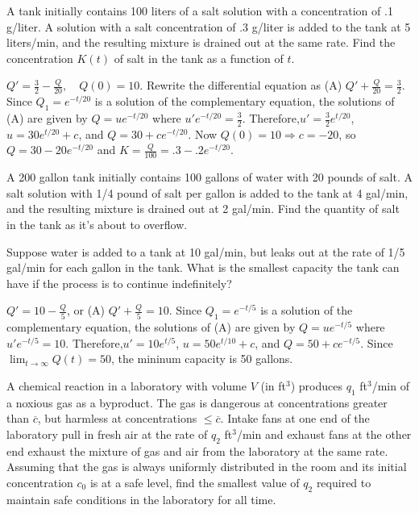 \documentclass{ximera}
\begin{document}
\begin{problem}\label{exer:4.2.10}
A  tank initially contains 100 liters of a salt solution
with a concentration of .1 g/liter.  A solution with a
salt concentration of .3 g/liter is added to the tank at
5 liters/min, and the resulting mixture is
drained out at the same rate.  Find the concentration $K(t)$
of salt in the tank as a function of $t$.

\begin{solution}
$Q'=\frac{3}{2}-\frac{Q}{20},\quad Q(0)=10$. Rewrite the
differential equation as (A) $Q'+\frac{Q}{20}=\frac{3}{2}$. Since
$Q_1=e^{-t/20}$ is a solution of the complementary equation, the
solutions of (A) are given by $Q=ue^{-t/20}$ where
$u'e^{-t/20}=\frac{3}{2}$. Therefore,$u'=\frac{3}{2}e^{t/20}$,
$u=30e^{t/20}+c$, and $Q=30+ce^{-t/20}$. Now $Q(0)=10\Rightarrow
c=-20$, so $Q=30-20e^{-t/20}$ and $K=\frac{Q}{100}=.3-.2e^{-t/20}$.
\end{solution}
\end{problem}

\begin{problem}\label{exer:4.2.11}
A 200 gallon tank initially contains 100 gallons of water
with 20 pounds of salt.  A salt solution with 1/4 pound of
salt per gallon is added to the tank at 4 gal/min, and the
resulting  mixture is drained out at 2 gal/min.
Find the quantity of salt in the tank as it's about to
overflow.
\end{problem}

\begin{problem}\label{exer:4.2.12}
Suppose  water is added to a tank at 10 gal/min, but leaks
out at the rate of 1/5 gal/min for each gallon in the tank.
What is the smallest capacity the tank can have if the
process is to continue indefinitely?

\begin{solution}
$Q'=10-\frac{Q}{5}$, or
 (A) $Q'+\frac{Q}{5}=10$. Since $Q_1=e^{-t/5}$ is a solution
of the complementary equation, the solutions of (A) are given by
$Q=ue^{-t/5}$ where $u'e^{-t/5}=10$. Therefore,$u'=10e^{t/5}$,
$u=50e^{t/10}+c$, and $Q=50+ce^{-t/5}$. Since
$\lim_{t\to\infty}Q(t)=50$, the mininum capacity is 50 gallons.
\end{solution}
\end{problem}

\begin{problem}\label{exer:4.2.13}
A chemical reaction in a laboratory with volume $V$ (in ft$^3$)
produces $q_1$ ft$^3$/min of a noxious gas as a byproduct. The gas is
dangerous at concentrations greater than $\overline c$,
 but harmless at
concentrations $\le \overline c$. Intake fans at one end of the
laboratory pull in fresh air at the rate of $q_2$ ft$^3$/min and
exhaust fans at the other end exhaust the mixture of gas and air from
the
laboratory at the same rate. Assuming that the gas is always uniformly
distributed in the room and its initial concentration $c_0$ is at a
safe level, find the smallest value of $q_2$ required to maintain safe
conditions in the laboratory for all time.
\end{problem}
\end{document}
